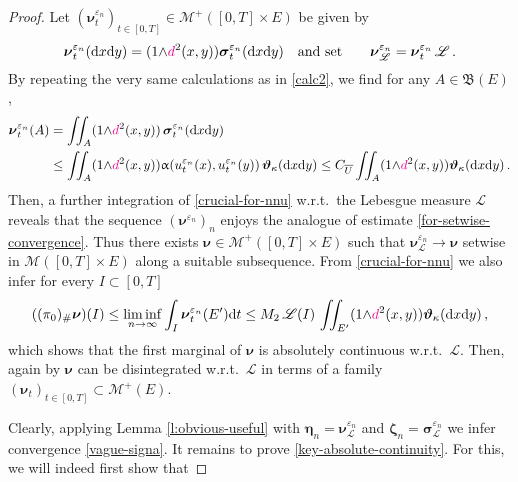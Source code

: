 \documentclass[11pt,reqno]{amsart}
\numberwithin{equation}{section}
\newcommand{\calM}{\mathcal{M}}
\newcommand{\scrL}{\mathscr{L}}
\newcommand{\eps}{\varepsilon}
\newcommand{\dd}{\mathrm{d}}
\theoremstyle{definition}
\newcommand{\ep}{\varepsilon}
\let\eps\ep
\def\dd{\mathrm{d}}
\newcommand{\teta}{\boldsymbol \vartheta}
\newcommand{\tetapi}{\boldsymbol{\teta}_{\kappa}}
\newcommand{\frB}{\mathfrak B}
\newcommand{\Lebone}{\scrL}
\newcommand{\Ed}{{E'}}
\newcommand{\ej}{\eps_n}
\newcommand{\ssigma}{\boldsymbol \sigma}
\newcommand{\nnu}{\boldsymbol \nu}
\newcommand{\zzeta}{\boldsymbol \zeta}
\newcommand{\eeta}{\boldsymbol \eta}
\newcommand{\RNEW}{\color{black}} %
\newcommand{\TODO}[1]{\todo[inline, color=cyan!20]{#1}}
\newcommand{\dpi}{{\color{magenta} d}}
\numberwithin{equation}{section}
\begin{document}
\begin{proof}
\RNEW Let 
    $(\nnu_{t}^{\ej})_{t \in [0,T]} \in \calM^+([0,T]{\times}E)$ \RNEW be given by
   \[
    \nnu_{t}^{\ej}(\dd x \dd y) = (1{\wedge} \dpi^2(x,y))\ssigma_t^{\ej} (\dd x \dd y)  \quad \text{and set} \qquad \nnu_{\Lebone}^{\ej}  = \nnu_t^{\ej} \, \Lebone\,.
    \]
By repeating the very same calculations as in \eqref{calc2}, we find for any $A\in \frB(E)$,
\begin{equation}
\label{crucial-for-nnu}
\begin{aligned}
\nnu_t^{\ej}(A)  & = \iint_A (1{\wedge} \dpi^2(x,y)) \,\ssigma_t^{\ej}(\dd x \dd y) \\ & \leq \iint_A (1{\wedge} \dpi^2(x,y))
 \upalpha(u_t^{\ej}(x),u_t^{\ej}(y) ) \, \tetapi(\dd x \dd y) 
 \leq  C_{\overline{U}}  \iint_A (1{\wedge} \dpi^2(x,y)) \tetapi(\dd x \dd y)\,.
 \end{aligned}
\end{equation}
Then, a further integration of  \eqref{crucial-for-nnu} w.r.t.\ the Lebesgue measure
$\Lebone$ reveals that 
 the sequence $(\nnu^{\ej})_n$ enjoys the analogue of estimate \eqref{for-setwise-convergence}.
Thus there exists   $\nnu \in \calM^+([0,T]{\times}E)$ %
 such that   
$ \nnu_{\Lebone}^{\ej} \to    \nnu $ setwise in $  \calM([0,T]{\times}E) $  \RNEW
 along a suitable subsequence.
From \eqref{crucial-for-nnu}  we also infer  for every $I \subset [0,T]$
\[
((\pi_0)_{\#} \nnu) (I) \leq \liminf_{n\to\infty} \int_I \nnu_t^{\ej}(E') \dd t \leq M_2 \,  \Lebone(I) \, \iint_{E'} (1{\wedge} \dpi^2(x,y)) \tetapi(\dd x \dd y)  \,,
\]
which shows that  the first marginal of $\nnu$ is absolutely continuous w.r.t.\ $\Lebone$. Then, again by \cite[Cor.\ 10.4.15]{Bogachev07}
  $\nnu$ can be disintegrated w.r.t.\ $\Lebone$ in terms of a family   $(\nnu_t)_{t\in [0,T]} \subset \calM^+(E)$. 
%  
 \par
 Clearly,
 applying  Lemma \ref{l:obvious-useful} with  %
 $\eeta_n = \nnu_{\Lebone}^{\ej} $
 and $\zzeta_n = \ssigma_{\Lebone}^{\ej} $ we infer convergence  \eqref{vague-signa}. 
 It remains to prove 
 \eqref{key-absolute-continuity}.
 For this, we will indeed first show that 

\end{proof}
\end{document}
